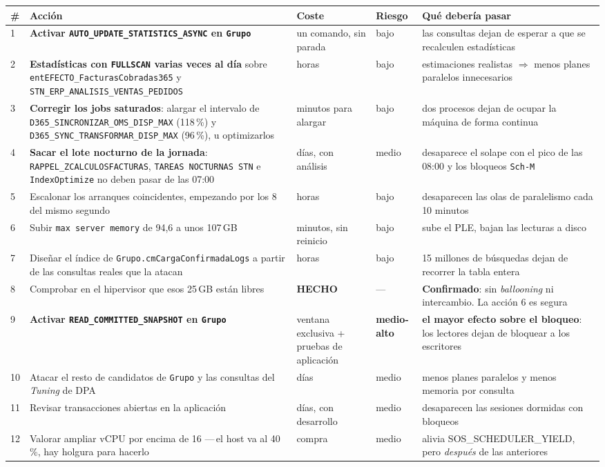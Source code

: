 \documentclass[11pt,a4paper]{article}
\newcommand{\cod}[1]{\texttt{\small #1}}
\newcommand{\bien}[1]{\textcolor{verde}{\textbf{#1}}}
\newcommand{\aviso}[1]{\textcolor{ambar}{\textbf{#1}}}
\begin{document}
\begin{longtable}{p{0.4cm}p{5.4cm}p{2.3cm}p{1.6cm}p{4.2cm}}
\toprule
\textbf{\#} & \textbf{Acción} & \textbf{Coste} & \textbf{Riesgo} &
\textbf{Qué debería pasar} \\
\midrule
\endhead
1 & \textbf{Activar \cod{AUTO\_UPDATE\_STATISTICS\_ASYNC} en \cod{Grupo}}
  & un comando, sin parada & bajo & las consultas dejan de esperar a que se
    recalculen estadísticas \\
2 & \textbf{Estadísticas con \cod{FULLSCAN} varias veces al día} sobre
    \cod{entEFECTO\_FacturasCobradas365} y
    \cod{STN\_ERP\_ANALISIS\_VENTAS\_PEDIDOS}
  & horas & bajo & estimaciones realistas $\Rightarrow$ menos planes paralelos
    innecesarios \\
3 & \textbf{Corregir los jobs saturados}: alargar el intervalo de
    \cod{D365\_SINCRONIZAR\_OMS\_DISP\_MAX} (118\,\%) y
    \cod{D365\_SYNC\_TRANSFORMAR\_DISP\_MAX} (96\,\%), u optimizarlos
  & minutos para alargar & bajo & dos procesos dejan de ocupar la máquina de
    forma continua \\
4 & \textbf{Sacar el lote nocturno de la jornada}: \cod{RAPPEL\_ZCALCULOS\-FACTURAS},
    \cod{TAREAS NOCTURNAS STN} e \cod{IndexOptimize} no deben pasar de las
    07:00
  & días, con análisis & medio & desaparece el solape con el pico de las 08:00
    y los bloqueos \cod{Sch-M} \\
5 & Escalonar los arranques coincidentes, empezando por los 8 del mismo segundo
  & horas & bajo & desaparecen las olas de paralelismo cada 10 minutos \\
6 & Subir \cod{max server memory} de 94,6 a unos 107\,GB
  & minutos, sin reinicio & bajo & sube el PLE, bajan las lecturas a disco \\
7 & Diseñar el índice de \cod{Grupo.cmCargaConfirmadaLogs} a partir de las
    consultas reales que la atacan
  & horas & bajo & 15 millones de búsquedas dejan de recorrer la tabla entera \\
8 & Comprobar en el hipervisor que esos 25\,GB están libres
  & \bien{HECHO} & --- & \bien{Confirmado}: sin \emph{ballooning} ni
    intercambio. La acción 6 es segura \\
9 & \textbf{Activar \cod{READ\_COMMITTED\_SNAPSHOT} en \cod{Grupo}}
  & ventana exclusiva + pruebas de aplicación & \aviso{medio-alto} &
    \textbf{el mayor efecto sobre el bloqueo}: los lectores dejan de bloquear
    a los escritores \\
10 & Atacar el resto de candidatos de \cod{Grupo} y las consultas del
    \emph{Tuning} de DPA
  & días & medio & menos planes paralelos y menos memoria por consulta \\
11 & Revisar transacciones abiertas en la aplicación
  & días, con desarrollo & medio & desaparecen las sesiones dormidas con bloqueos \\
12 & Valorar ampliar vCPU por encima de 16 —\,el host va al 40\,\%, hay
    holgura para hacerlo
  & compra & medio & alivia SOS\_SCHEDULER\_YIELD, pero \emph{después} de las
    anteriores \\
\bottomrule
\end{longtable}
\end{document}

